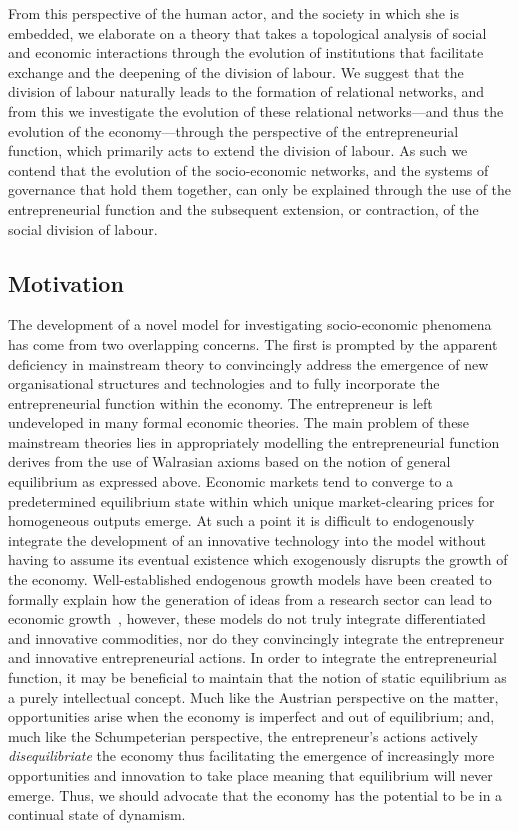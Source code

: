 From this perspective of the human actor, and the society in which she is embedded, we elaborate on a theory that takes a topological analysis of social and economic interactions through the evolution of institutions that facilitate exchange and the deepening of the division of labour. We suggest that the division of labour naturally leads to the formation of relational networks, and from this we investigate the evolution of these relational networks---and thus the evolution of the economy---through the perspective of the entrepreneurial function, which primarily acts to extend the division of labour. As such we contend that the evolution of the socio-economic networks, and the systems of governance that hold them together, can only be explained through the use of the entrepreneurial function and the subsequent extension, or contraction, of the social division of labour.

\subsection{Motivation}

The development of a novel model for investigating socio-economic phenomena has come from two overlapping concerns. The first is prompted by the apparent deficiency in mainstream theory to convincingly address the emergence of new organisational structures and technologies and to fully incorporate the entrepreneurial function within the economy. The entrepreneur is left undeveloped in many formal economic theories. The main problem of these mainstream theories lies in appropriately modelling the entrepreneurial function derives from the use of Walrasian axioms based on the notion of general equilibrium as expressed above. Economic markets tend to converge to a predetermined equilibrium state within which unique market-clearing prices for homogeneous outputs emerge. At such a point it is difficult to endogenously integrate the development of an innovative technology into the model without having to assume its eventual existence which exogenously disrupts the growth of the economy. Well-established endogenous growth models have been created to formally explain how the generation of ideas from a research sector can lead to economic growth~\citep{Romer1990}, however, these models do not truly integrate differentiated and innovative commodities, nor do they convincingly integrate the entrepreneur and innovative entrepreneurial actions. In order to integrate the entrepreneurial function, it may be beneficial to maintain that the notion of static equilibrium as a purely intellectual concept. Much like the Austrian perspective on the matter, opportunities arise when the economy is imperfect and out of equilibrium; and, much like the Schumpeterian perspective, the entrepreneur's actions actively \emph{disequilibriate} the economy thus facilitating the emergence of increasingly more opportunities and innovation to take place meaning that equilibrium will never emerge. Thus, we should advocate that the economy has the potential to be in a continual state of dynamism.


